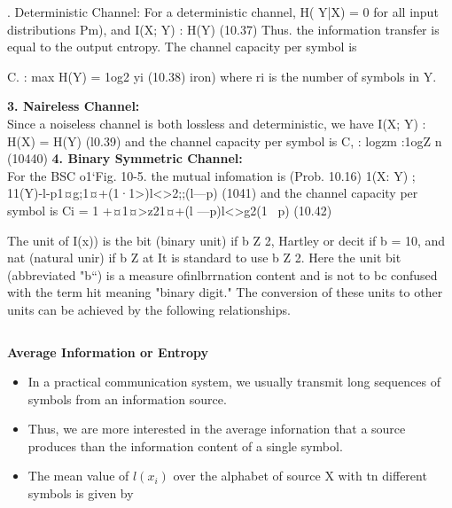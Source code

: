 \documentclass[a4]{beamer}
\begin{document}
. Deterministic Channel:
For a deterministic channel, H( Y|X) = 0 for all input distributions Pm), and
I(X; Y) : H(Y) (10.37)
Thus. the information transfer is equal to the output cntropy. The channel capacity per symbol is

C. : max H(Y) = 1og2 yi (10.38)
iron)
where ri is the number of symbols in Y.


\medskip
\textbf{3. Naireless Channel:}\\
Since a noiseless channel is both lossless and deterministic, we have
I(X; Y) : H(X) = H(Y) (l0.39)
and the channel capacity per symbol is
C, : logzm :1ogZ n (10440)
\textbf{4. Binary Symmetric Channel:}\\
For the BSC o1`Fig. 10-5. the mutual infomation is (Prob. 10.16)
1(X: Y) ; 11(Y)-l-p1¤g;1¤+(1·1>)l<>2;;(l—p) (1041)
and the channel capacity per symbol is
Ci = 1 +¤1¤>z21¤+(l —p)l<>g2(1 ~p) (10.42)
















\medskip
The unit of I(x)) is the bit (binary unit) if b Z 2, Hartley or decit if b = 10, and nat (natural unir) if
b Z at It is standard to use b Z 2. Here the unit bit (abbreviated "b“) is a measure ofinlbrrnation
content and is not to bc confused with the term hit meaning "binary digit." The conversion of these
units to other units can be achieved by the following relationships.

\[   \]

\medskip
\noindent \textbf{Average Information or Entropy}
\begin{itemize}
\item In a practical communication system, we usually transmit long sequences of symbols from an
information source. \item Thus, we are more interested in the average infornation that a source produces
than the information content of a single symbol.
\item The mean value of $ l(x_i)$ over the alphabet of source X with tn different symbols is given by
\[ \]
\end{itemize}
\end{document}
